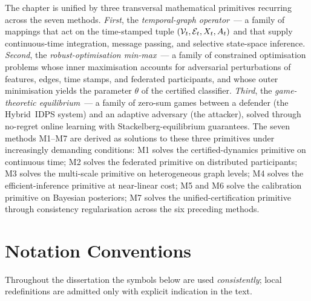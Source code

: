 The chapter is unified by three transversal mathematical primitives recurring across the seven methods. \emph{First}, the \emph{temporal-graph operator}~--- a family of mappings that act on the time-stamped tuple $(\mathcal{V}_t,\mathcal{E}_t,X_t,A_t)$ and that supply continuous-time integration, message passing, and selective state-space inference. \emph{Second}, the \emph{robust-optimisation min-max}~--- a family of constrained optimisation problems whose inner maximisation accounts for adversarial perturbations of features, edges, time stamps, and federated participants, and whose outer minimisation yields the parameter $\theta$ of the certified classifier. \emph{Third}, the \emph{game-theoretic equilibrium}~--- a family of zero-sum games between a defender (the Hybrid~IDPS system) and an adaptive adversary (the attacker), solved through no-regret online learning with Stackelberg-equilibrium guarantees. The seven methods M1--M7 are derived as solutions to these three primitives under increasingly demanding conditions: M1 solves the certified-dynamics primitive on continuous time; M2 solves the federated primitive on distributed participants; M3 solves the multi-scale primitive on heterogeneous graph levels; M4 solves the efficient-inference primitive at near-linear cost; M5 and M6 solve the calibration primitive on Bayesian posteriors; M7 solves the unified-certification primitive through consistency regularisation across the six preceding methods.
\section*{Notation Conventions}
\label{sec:notation_conventions}

Throughout the dissertation the symbols below are used
\emph{consistently}; local redefinitions are admitted only with
explicit indication in the text.

